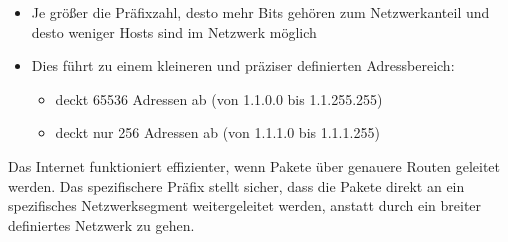 \begin{infoBox}[title=Warum ist ein spezifischeres Präfix genauer?]
    \begin{itemize}
        \item Je größer die Präfixzahl, desto mehr Bits gehören zum Netzwerkanteil und desto weniger Hosts sind im Netzwerk möglich
        \item Dies führt zu einem kleineren und präziser definierten Adressbereich:
        \begin{itemize}
            \item {} deckt 65536 Adressen ab (von 1.1.0.0 bis 1.1.255.255)
            \item {} deckt nur 256 Adressen ab (von 1.1.1.0 bis 1.1.1.255)
        \end{itemize}
    \end{itemize}
\end{infoBox}
\begin{infoBox}[title=Warum hat das Priorität?]
    Das Internet funktioniert effizienter, wenn Pakete über genauere Routen geleitet werden. Das spezifischere Präfix stellt sicher, dass die Pakete direkt an ein spezifisches Netzwerksegment weitergeleitet werden, anstatt durch ein breiter definiertes Netzwerk zu gehen.
\end{infoBox}
